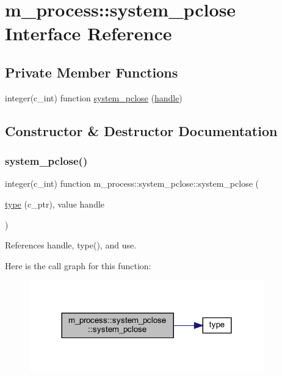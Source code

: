 \hypertarget{interfacem__process_1_1system__pclose}{}\section{m\+\_\+process\+:\+:system\+\_\+pclose Interface Reference}
\label{interfacem__process_1_1system__pclose}
\subsection*{Private Member Functions}
\begin{DoxyCompactItemize}
\item 
integer(c\+\_\+int) function \hyperlink{interfacem__process_1_1system__pclose_a8484cc191f8a18e155f97e284c3795ab}{system\+\_\+pclose} (\hyperlink{leave__watchgroup_83_8txt_ad6c5ebd26f707ef8da754021612a7c8d}{handle})
\end{DoxyCompactItemize}


\subsection{Constructor \& Destructor Documentation}
\mbox{\label{interfacem__process_1_1system__pclose_a8484cc191f8a18e155f97e284c3795ab}} 
\subsubsection{\texorpdfstring{system\+\_\+pclose()}{system\_pclose()}}
{\footnotesize\ttfamily integer(c\+\_\+int) function m\+\_\+process\+::system\+\_\+pclose\+::system\+\_\+pclose (\begin{DoxyParamCaption}\item[{\hyperlink{stop__watch_83_8txt_a70f0ead91c32e25323c03265aa302c1c}{type} (c\+\_\+ptr), value}]{handle }\end{DoxyParamCaption})\hspace{0.3cm}{\ttfamily [private]}}



References handle, type(), and use.

Here is the call graph for this function\+:
\nopagebreak
\begin{figure}[H]
\begin{center}
\leavevmode
\includegraphics[width=288pt]{interfacem__process_1_1system__pclose_a8484cc191f8a18e155f97e284c3795ab_cgraph}
\end{center}
\end{figure}



